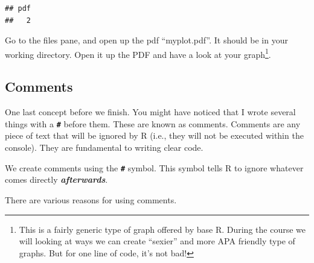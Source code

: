 \documentclass[
]{book}
\newenvironment{Shaded}{\begin{snugshade}}{\end{snugshade}}
\newcommand{\AttributeTok}[1]{\textcolor[rgb]{0.13,0.29,0.53}{#1}}
\newcommand{\CommentTok}[1]{\textcolor[rgb]{0.56,0.35,0.01}{\textit{#1}}}
\newcommand{\FunctionTok}[1]{\textcolor[rgb]{0.13,0.29,0.53}{\textbf{#1}}}
\newcommand{\NormalTok}[1]{#1}
\newcommand{\SpecialCharTok}[1]{\textcolor[rgb]{0.81,0.36,0.00}{\textbf{#1}}}
\newcommand{\StringTok}[1]{\textcolor[rgb]{0.31,0.60,0.02}{#1}}
\begin{document}
\begin{Shaded}
\end{Shaded}

\begin{verbatim}
## pdf 
##   2
\end{verbatim}

Go to the files pane, and open up the pdf ``myplot.pdf''. It should be in your working directory. Open it up the PDF and have a look at your graph\footnote{This is a fairly generic type of graph offered by base R. During the course we will looking at ways we can create ``sexier'' and more APA friendly type of graphs. But for one line of code, it's not bad!}.

\hypertarget{comments}{%
\subsection{Comments}\label{comments}}

One last concept before we finish. You might have noticed that I wrote several things with a \textbf{\texttt{\#}} before them. These are known as comments. Comments are any piece of text that will be ignored by R (i.e., they will not be executed within the console). They are fundamental to writing clear code.

We create comments using the \textbf{\texttt{\#}} symbol. This symbol tells R to ignore whatever comes directly \textbf{\emph{afterwards}}.

There are various reasons for using comments.
\end{document}

